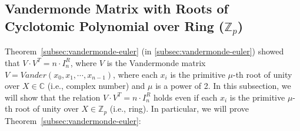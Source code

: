 \subsection{Vandermonde Matrix with Roots of Cyclotomic Polynomial over Ring ($\mathbb{Z}_p$)}
\label{subsec:vandermonde-euler-integer-ring}

Theorem~\ref*{subsec:vandermonde-euler} (in \autoref{subsec:vandermonde-euler}) showed that $V \cdot V^T = n \cdot I^R_n$, where $V$ is the Vandermonde matrix $V = \mathit{Vander}(x_0, x_1, \cdots, x_{n-1})$, where each $x_i$ is the primitive $\mu$-th root of unity over $X \in \mathbb{C}$ (i.e., complex number) and $\mu$ is a power of 2. In this subsection, we will show that the relation $V \cdot V^T = n \cdot I^R_n$ holds even if each $x_i$ is the primitive $\mu$-th root of unity over $X \in \mathbb{Z}_p$ (i.e., ring). In particular, we will prove Theorem~\ref*{subsec:vandermonde-euler}: 


